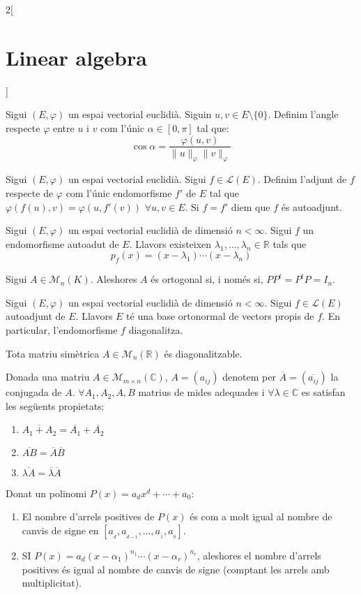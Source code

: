 \documentclass[../../../main.tex]{subfiles}
\begin{document}
\begin{multicols}{2}[\section{Linear algebra}]
\begin{definition}
Sigui $(E,\varphi)$ un espai vectorial euclidià. Siguin $u,v\in E\setminus\{0\}$. Definim l'angle respecte $\varphi$ entre $u$ i $v$ com l'únic $\alpha\in[0,\pi]$ tal que: $$\cos{\alpha}=\frac{\varphi(u,v)}{\|u\|_\varphi\|v\|_\varphi}$$
\end{definition}
\begin{definition}
Sigui $(E,\varphi)$ un espai vectorial euclidià. Sigui $f\in\mathcal{L}(E)$. Definim l'adjunt de $f$ respecte de $\varphi$ com l'únic endomorfisme $f'$ de $E$ tal que $\varphi(f(u),v)=\varphi(u,f'(v))$ $\forall u,v\in E$. Si $f=f'$ diem que $f$ és autoadjunt. 
\end{definition}
\begin{lemma}
Sigui $(E,\varphi)$ un espai vectorial euclidià de dimensió $n<\infty$. Sigui $f$ un endomorfisme autoadut de $E$. Llavors existeixen $\lambda_1,\ldots,\lambda_n\in\mathbb{R}$ tals que $$p_f(x)=(x-\lambda_1 )\cdots(x-\lambda_n)$$
\end{lemma}
\begin{definition}
Sigui $A\in\mathcal{M}_n(K)$. Aleshores $A$ és ortogonal si, i només si, $PP^t=P^tP=I_n$.
\end{definition}
\begin{theorem}
Sigui $(E,\varphi)$ un espai vectorial euclidià de dimensió $n<\infty$. Sigui $f\in\mathcal{L}(E)$ autoadjunt de $E$. Llavors $E$ té una base ortonormal de vectors propis de $f$. En particular, l’endomorfisme $f$ diagonalitza.
\end{theorem}
\begin{corollary}
Tota matriu simètrica $A\in\mathcal{M}_n(\mathbb{R})$ és diagonalitzable.
\end{corollary}
\begin{definition}
Donada una matriu $A\in\mathcal{M}_{m\times n}(\mathbb{C})$, $A=(a_{ij})$ denotem per $\overline{A}=(\overline{a_{ij}})$ la conjugada de $A$. $\forall A_1,A_2,A,B$ matrius de mides adequades i $\forall\lambda\in\mathbb{C}$ es satisfan les següents propietats:
\begin{enumerate}
    \item $\overline{A_1+A_2}=\overline{
    A_1}+\overline{A_2}$
    \item $\overline{AB}=\overline{
    A}\overline{B}$
    \item $\overline{\lambda A}=\overline{\lambda}\overline{A}$
\end{enumerate}
\end{definition}
\begin{theorem}
Donat un polinomi $P(x)=a_dx^d+\cdots+a_0$:
\begin{enumerate}
    \item El nombre d'arrels positives de $P(x)$ és com a molt igual al nombre de canvis de signe en $[a_{\!_d},a_{\!_{d-1}},\ldots,a_{\!_1},a_{\!_0}]$.
    \item SI $P(x)=a_d(x-\alpha_1)^{n_1}\cdots(x-\alpha_r)^{n_r}$, aleshores el nombre d'arrels positives és igual al nombre de canvis de signe (comptant les arrels amb multiplicitat).
\end{enumerate}
\end{theorem}
\end{multicols}
\end{document}
